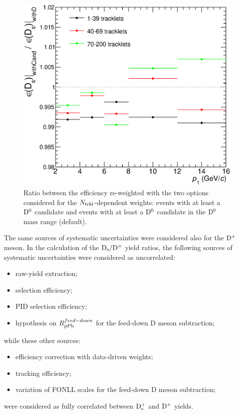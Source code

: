 \begin{figure}[htpb]
\centering
 \includegraphics[width=.49\textwidth]{FigCap6/SystOnDWeightsWithCandVsWithD_Dsonly.eps}
 \caption{Ratio between the efficiency re-weighted with the two options considered for the $N_{\rm trkl}$-dependent weights: events with 
 at least a ${\rm D^0}$ candidate and events with at least a ${\rm D^0}$ candidate in the ${\rm D^0}$ mass range (default).}
 \label{fig:DsDplusVsMult_SystEffWeights}
\end{figure}



The same sources of systematic uncertainties were considered also for the ${\rm D^+}$ meson.
In the calculation of the ${\rm D_s}/{\rm D^+}$ yield ratios, the following sources of systematic 
uncertainties were considered as uncorrelated:
\begin{itemize}
\item raw-yield extraction;
\item selection efficiency;
\item PID selection efficiency;
\item hypothesis on $R_{\rm pPb}^{feed-down}$ for the feed-down D meson subtraction;
\end{itemize}
while these other sources:
\begin{itemize}
\item efficiency correction with data-driven weights;
\item tracking efficiency;
\item variation of FONLL scales for the feed-down D meson subtraction;
\end{itemize} 
were considered as fully correlated between ${\rm D_s^+}$ and ${\rm D^+}$ yields.


